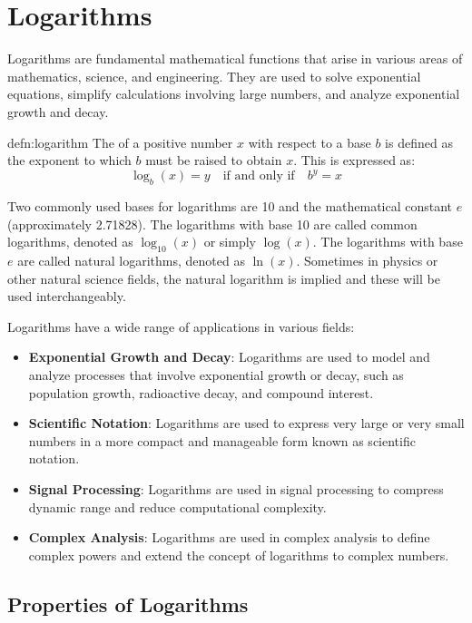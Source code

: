 \section{Logarithms}

Logarithms are fundamental mathematical functions that arise in various areas of mathematics, science, and engineering. They are used to solve exponential equations, simplify calculations involving large numbers, and analyze exponential growth and decay.

\begin{defn}[Logarithm]{defn:logarithm}
  The  of a positive number \(x\) with respect to a base \(b\) is defined as the exponent to which \(b\) must be raised to obtain \(x\). This is expressed as:
  \begin{equation}
  \log_b(x) = y \quad \text{if and only if} \quad b^y = x
  \end{equation}
\end{defn}

Two commonly used bases for logarithms are 10 and the mathematical constant \(e\) (approximately 2.71828). The logarithms with base 10 are called common logarithms, denoted as \(\log_{10}(x)\) or simply \(\log(x)\). The logarithms with base \(e\) are called natural logarithms, denoted as \(\ln(x)\). Sometimes in physics or other natural science fields, the natural logarithm is implied and these will be used interchangeably.

Logarithms have a wide range of applications in various fields:

\begin{itemize}
	\item \textbf{Exponential Growth and Decay}: Logarithms are used to model and analyze processes that involve exponential growth or decay, such as population growth, radioactive decay, and compound interest.
	\item \textbf{Scientific Notation}: Logarithms are used to express very large or very small numbers in a more compact and manageable form known as scientific notation.
	\item \textbf{Signal Processing}: Logarithms are used in signal processing to compress dynamic range and reduce computational complexity.
	\item \textbf{Complex Analysis}: Logarithms are used in complex analysis to define complex powers and extend the concept of logarithms to complex numbers.
\end{itemize}

\subsection{Properties of Logarithms}

